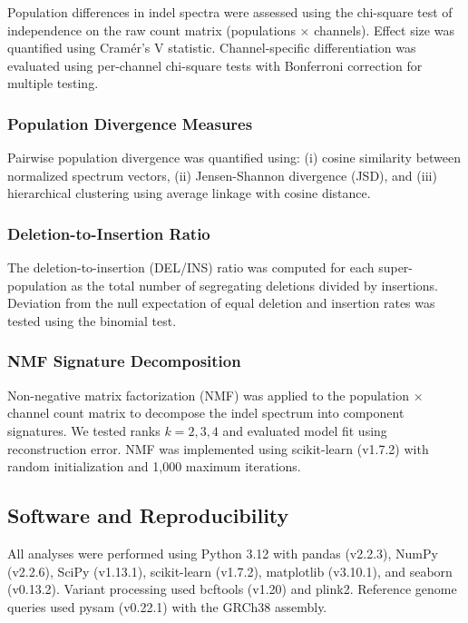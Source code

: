 \documentclass[11pt,a4paper]{article}
\begin{document}
Population differences in indel spectra were assessed using the chi-square test of independence on the raw count matrix (populations $\times$ channels). Effect size was quantified using Cram\'er's V statistic. Channel-specific differentiation was evaluated using per-channel chi-square tests with Bonferroni correction for multiple testing.

\subsubsection{Population Divergence Measures}

Pairwise population divergence was quantified using: (i) cosine similarity between normalized spectrum vectors, (ii) Jensen-Shannon divergence (JSD), and (iii) hierarchical clustering using average linkage with cosine distance.

\subsubsection{Deletion-to-Insertion Ratio}

The deletion-to-insertion (DEL/INS) ratio was computed for each super-population as the total number of segregating deletions divided by insertions. Deviation from the null expectation of equal deletion and insertion rates was tested using the binomial test.

\subsubsection{NMF Signature Decomposition}

Non-negative matrix factorization (NMF) \citep{lee1999learning} was applied to the population $\times$ channel count matrix to decompose the indel spectrum into component signatures. We tested ranks $k = 2, 3, 4$ and evaluated model fit using reconstruction error. NMF was implemented using scikit-learn (v1.7.2) \citep{pedregosa2011scikit} with random initialization and 1,000 maximum iterations.

\subsection{Software and Reproducibility}

All analyses were performed using Python 3.12 with pandas (v2.2.3), NumPy (v2.2.6), SciPy (v1.13.1), scikit-learn (v1.7.2), matplotlib (v3.10.1), and seaborn (v0.13.2). Variant processing used bcftools (v1.20) and plink2. Reference genome queries used pysam (v0.22.1) with the GRCh38 assembly.
\end{document}
